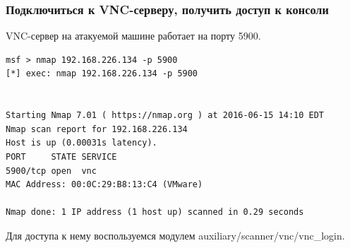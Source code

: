 \documentclass[10pt,a4paper,titlepage]{article}
\begin{document}
\subsubsection{Подключиться к VNC-серверу, получить доступ к консоли}
VNC-сервер на атакуемой машине работает на порту 5900.
\begin{verbatim}
msf > nmap 192.168.226.134 -p 5900
[*] exec: nmap 192.168.226.134 -p 5900


Starting Nmap 7.01 ( https://nmap.org ) at 2016-06-15 14:10 EDT
Nmap scan report for 192.168.226.134
Host is up (0.00031s latency).
PORT     STATE SERVICE
5900/tcp open  vnc
MAC Address: 00:0C:29:B8:13:C4 (VMware)

Nmap done: 1 IP address (1 host up) scanned in 0.29 seconds
\end{verbatim}
Для доступа к нему воспользуемся модулем auxiliary/scanner/vnc/vnc\_login. 
\end{document}
